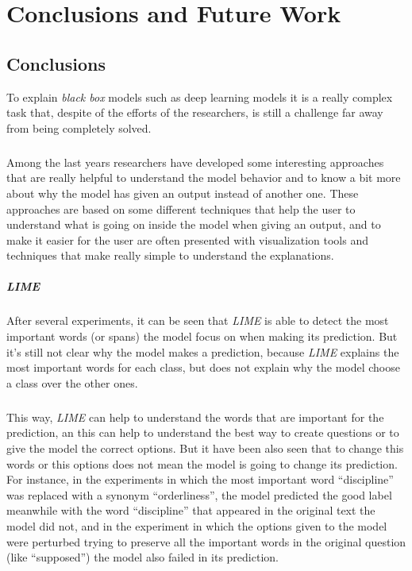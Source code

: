 
\chapter{Conclusions and Future Work}
\label{ch:ConclusionsAndFutureWork}
\section{Conclusions}
\label{sec:Conclusions}
\noindent To explain \emph{black box} models such as deep learning models it is a really complex task that, despite of the efforts of the researchers, is still a challenge far away from being completely solved. 
\paragraph{}
Among the last years researchers have developed some interesting approaches that are really helpful to understand the model behavior and to know a bit more about why the model has given an output instead of another one. These approaches are based on some different techniques that help the user to understand what is going on inside the model when giving an output, and to make it easier for the user are often presented with visualization tools and techniques that make really simple to understand the explanations. 
\paragraph{LIME} After several experiments, it can be seen that \emph{LIME} is able to detect the most important words (or spans) the model focus on when making its prediction. But it's still not clear why the model makes a prediction, because \emph{LIME} explains the most important words for each class, but does not explain why the model choose a class over the other ones.
\paragraph{}
This way, \emph{LIME} can help to understand the words that are important for the prediction, an this can help to understand the best way to create questions or to give the model the correct options. But it have been also seen that to change this words or this options does not mean the model is going to change its prediction. For instance, in the experiments in which the most important word ``discipline'' was replaced with a synonym ``orderliness'', the model predicted the good label meanwhile with the word ``discipline'' that appeared in the original text the model did not, and in the experiment in which the options given to the model were perturbed trying to preserve all the important words in the original question (like ``supposed'') the model also failed in its prediction.
